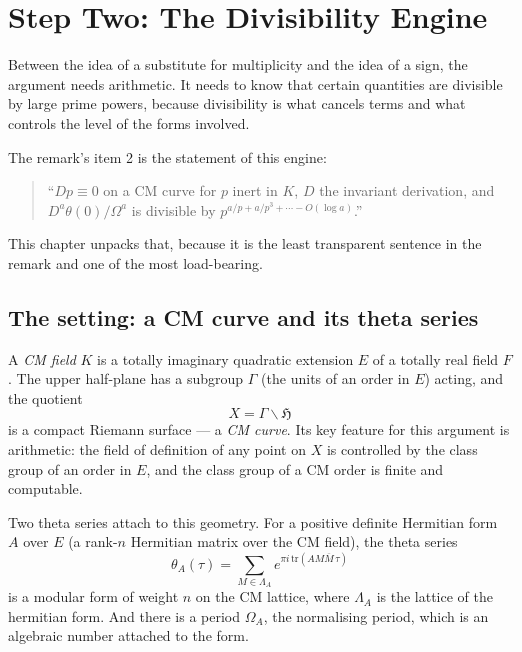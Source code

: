 
\chapter{Step Two: The Divisibility Engine}
\label{ch:step2}

Between the idea of a substitute for multiplicity and the idea of a sign, the
argument needs arithmetic. It needs to know that certain quantities are
divisible by large prime powers, because divisibility is what cancels terms and
what controls the level of the forms involved.

The remark's item 2 is the statement of this engine:

\begin{quote}
\small
``$Dp \equiv 0$ on a CM curve for $p$ inert in $K$, $D$ the invariant
derivation, and $D^a \theta(0) / \Omega^a$ is divisible by $p^{a/p + a/p^3 +
\cdots - O(\log a)}$.''
\end{quote}

This chapter unpacks that, because it is the least transparent sentence in the
remark and one of the most load-bearing.

\section{The setting: a CM curve and its theta series}A \emph{CM field} $K$ is a totally imaginary quadratic extension $E$ of a
totally real field $F$. The upper half-plane has a subgroup $\Gamma$ (the
units of an order in $E$) acting, and the quotient
\[
X = \Gamma \backslash \mathfrak{H}
\]
is a compact Riemann surface --- a \emph{CM curve}. Its key feature for this
argument is arithmetic: the field of definition of any point on $X$ is
controlled by the class group of an order in $E$, and the class group of a CM
order is finite and computable.

Two theta series attach to this geometry. For a positive definite
Hermitian form $A$ over $E$ (a rank-$n$ Hermitian matrix over the CM field),
the theta series
\begin{equation}
\theta_A(\tau) = \sum_{M \in \Lambda_A} e^{\pi i\,\mathrm{tr}(A M \overline{M}\,\tau)}
\label{eq:theta}
\end{equation}
is a modular form of weight $n$ on the CM lattice, where $\Lambda_A$ is the
lattice of the hermitian form. And there is a period $\Omega_A$, the
normalising period, which is an algebraic number attached to the form.

